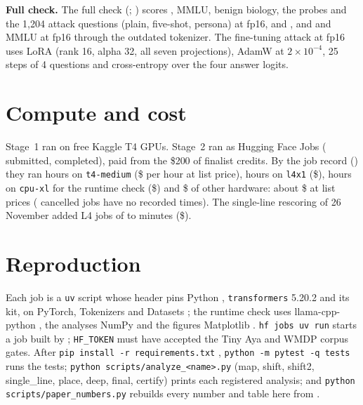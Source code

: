 \textbf{Full check.} The full check (; ) scores \wmdp{}, MMLU, benign biology, the probes and the 1,204 attack questions (plain, five-shot, persona) at fp16, \fq{} and \nf{}, and \wmdp{} and MMLU at fp16 through the outdated tokenizer. The fine-tuning attack at fp16 uses LoRA \citep{hu2021lora,peft} (rank 16, alpha 32, all seven projections), AdamW \citep{loshchilov2019adamw} at $2\times10^{-4}$, 25 steps of 4 questions and cross-entropy over the four answer logits. 

\section{Compute and cost}
\label{app:compute}

Stage~1 ran on free Kaggle T4 GPUs. Stage~2 ran as Hugging Face Jobs \citep{hfjobs} (\revAll{} submitted, \revCompleted{} completed), paid from the \$200 of finalist credits. By the job record () they ran \costHoursT{} hours on \texttt{t4-medium} (\$\costPriceT{} per hour at list price), \costHoursL{} hours on \texttt{l4x1} (\$\costPriceL), \costHoursCpu{} hours on \texttt{cpu-xl} for the runtime check (\$\costPriceCpu) and \$\costOther{} of other hardware: about \$\costTotal{} at list prices (\costNoTimes{} cancelled jobs have no recorded times). The single-line rescoring of 26 November added \costSingleJobs{} L4 jobs of \costSingleMinLow{} to \costSingleMinHigh{} minutes (\$\costSingle).

\section{Reproduction}
\label{app:repro}

Each job is a \texttt{uv} \citep{uv} script whose header pins Python \citep{python}, \texttt{transformers} 5.20.2 \citep{wolf2020transformers} and its kit, on PyTorch, Tokenizers and Datasets \citep{paszke2019pytorch,hftokenizers,lhoest2021datasets}; the runtime check uses llama-cpp-python \citep{llamacpppython}, the analyses NumPy \citep{harris2020numpy} and the figures Matplotlib \citep{hunter2007matplotlib}. \texttt{hf jobs uv run} starts a job built by ; \texttt{HF\_TOKEN} must have accepted the Tiny Aya and WMDP corpus gates. After \texttt{pip install -r requirements.txt} \citep{pip}, \texttt{python -m pytest -q tests} \citep{pytest} runs the tests; \texttt{python scripts/analyze\_<name>.py} (map, shift, shift2, single\_line, place, deep, final, certify) prints each registered analysis; and \texttt{python scripts/paper\_numbers.py} rebuilds every number and table here from .

